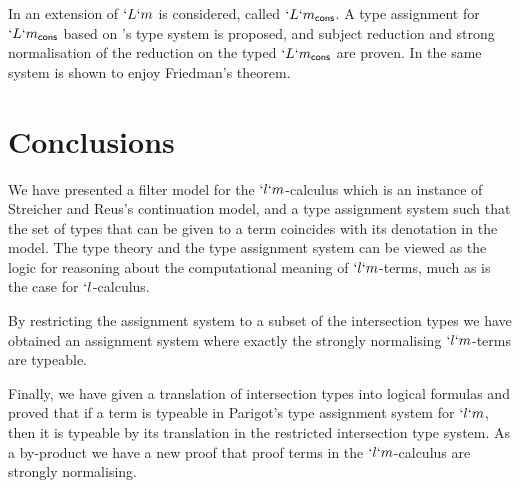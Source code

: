 \documentclass{CSML}
\begin{document}
In \cite{NakazawaN14} an extension of $`L`m$ is considered, called $`L`m_{\sf cons}$. 
A type assignment for $`L`m_{\sf cons}$ based on \cite{deLiguoro:ApproxLM12}'s type system is proposed, and subject reduction and strong normalisation of the reduction on the typed $`L`m_{\sf cons}$ are proven. 
In \cite{Nakazawa-ITRS14} the same system is shown to enjoy Friedman's theorem.


 \section*{Conclusions} \label{conclusions}
We have presented a filter model for the $`l`m$-calculus which is an instance of Streicher and Reus's continuation model, and a type assignment system such that the set of types that can be given to a term coincides with its denotation in the model. 
The type theory and the type assignment system can be viewed as the logic for reasoning about the computational meaning of $`l`m$-terms, much as is the case for $`l$-calculus. 

By restricting the assignment system to a subset of the intersection types we have obtained an assignment system where exactly the strongly normalising $`l`m$-terms are typeable. 

Finally, we have given a translation of intersection types into logical formulas and proved that if a term is typeable in Parigot's type assignment system for $`l`m$, then it is typeable by its translation in the restricted intersection type system. 
As a by-product we have a new proof that proof terms in the $`l`m$-calculus are strongly normalising.


%  
\end{document}
